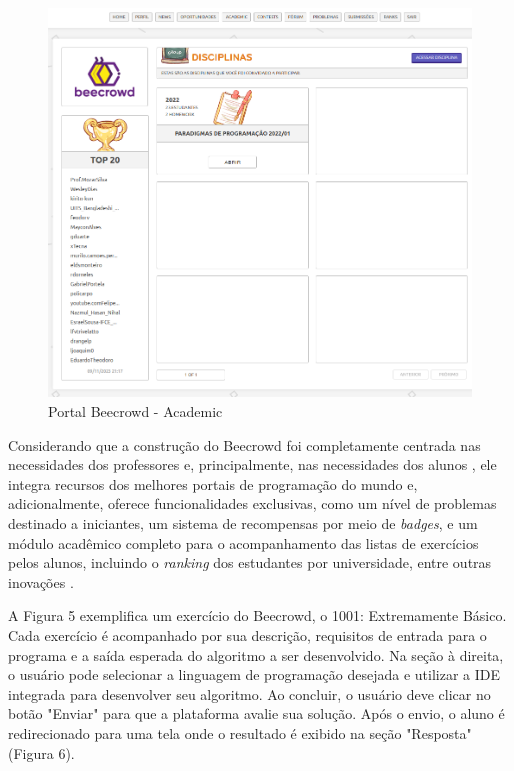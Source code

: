 \begin{figure}[h!]
	   \centering
            \caption{Portal Beecrowd - Academic}
            \label{fig:ModeloConceitual}
	   	\includegraphics[scale=0.3]{pictures/beecrowd_academic.png}
\end{figure}

Considerando que a construção do Beecrowd foi completamente centrada nas necessidades dos professores e, principalmente, nas necessidades dos alunos \cite[p.~239]{beztonin2014}, ele integra recursos dos melhores portais de programação do mundo e, adicionalmente, oferece funcionalidades exclusivas, como um nível de problemas destinado a iniciantes, um sistema de recompensas por meio de \textit{badges}, e um módulo acadêmico completo para o acompanhamento das listas de exercícios pelos alunos, incluindo o \textit{ranking} dos estudantes por universidade, entre outras inovações \cite[p.~239]{beztonin2014}.

A Figura 5 exemplifica um exercício do Beecrowd, o 1001: Extremamente Básico. Cada exercício é acompanhado por sua descrição, requisitos de entrada para o programa e a saída esperada do algoritmo a ser desenvolvido. Na seção à direita, o usuário pode selecionar a linguagem de programação desejada e utilizar a IDE integrada para desenvolver seu algoritmo. Ao concluir, o usuário deve clicar no botão "Enviar" para que a plataforma avalie sua solução. Após o envio, o aluno é redirecionado para uma tela onde o resultado é exibido na seção "Resposta" (Figura 6).

